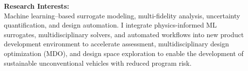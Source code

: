 
\begin{cvparagraph}
    \textbf{{\fontsize{10}{12}\selectfont Research Interests: }} \\
    Machine learning–based surrogate modeling, multi-fidelity analysis, uncertainty quantification, and design automation. I integrate physics-informed ML surrogates, multidisciplinary solvers, and automated workflows into new product development environment to accelerate assessment, multidisciplinary design optimization (MDO), and design space exploration to enable the development of sustainable unconventional vehicles with reduced program risk.
\end{cvparagraph}
